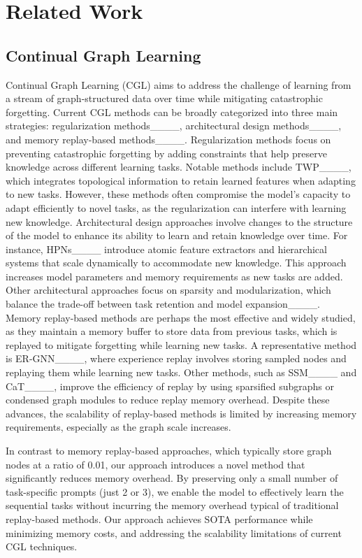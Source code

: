 \section{Related Work}
\subsection{Continual Graph Learning}

Continual Graph Learning (CGL) aims to address the challenge of learning from a stream of graph-structured data over time while mitigating catastrophic forgetting. Current CGL methods can be broadly categorized into three main strategies: regularization methods____, architectural design methods____, and memory replay-based methods____. Regularization methods focus on preventing catastrophic forgetting by adding constraints that help preserve knowledge across different learning tasks. Notable methods include TWP____, which integrates topological information to retain learned features when adapting to new tasks. However, these methods often compromise the model's capacity to adapt efficiently to novel tasks, as the regularization can interfere with learning new knowledge. Architectural design approaches involve changes to the structure of the model to enhance its ability to learn and retain knowledge over time. For instance, HPNs____ introduce atomic feature extractors and hierarchical systems that scale dynamically to accommodate new knowledge. This approach increases model parameters and memory requirements as new tasks are added. Other architectural approaches focus on sparsity and modularization, which balance the trade-off between task retention and model expansion____. Memory replay-based methods are perhaps the most effective and widely studied, as they maintain a memory buffer to store data from previous tasks, which is replayed to mitigate forgetting while learning new tasks. A representative method is ER-GNN____, where experience replay involves storing sampled nodes and replaying them while learning new tasks. Other methods, such as SSM____ and CaT____, improve the efficiency of replay by using sparsified subgraphs or condensed graph modules to reduce replay memory overhead. Despite these advances, the scalability of replay-based methods is limited by increasing memory requirements, especially as the graph scale increases. 

In contrast to memory replay-based approaches, which typically store graph nodes at a ratio of 0.01, our approach introduces a novel method that significantly reduces memory overhead. By preserving only a small number of task-specific prompts (just 2 or 3), we enable the model to effectively learn the sequential tasks without incurring the memory overhead typical of traditional replay-based methods. Our approach achieves SOTA performance while minimizing memory costs, and addressing the scalability limitations of current CGL techniques.

